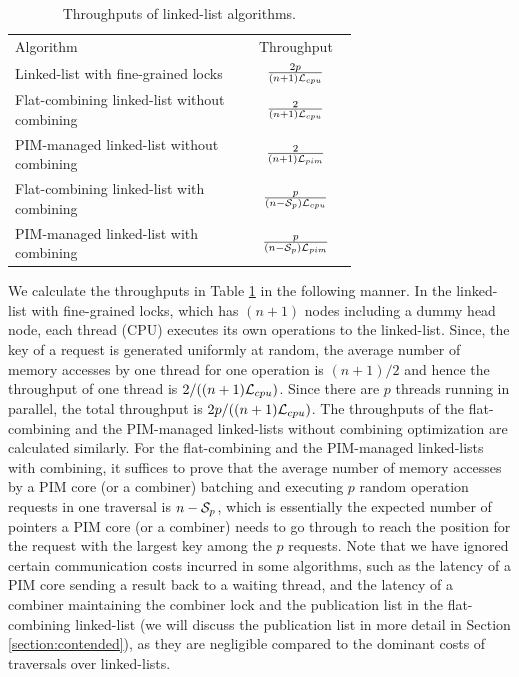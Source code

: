 \renewcommand{\arraystretch}{1.8}
\begin{table}[ht!]
\begin{center}
	\begin{tabular}{| m{0.68\linewidth}  | c |}    
    \hline
    Algorithm & Throughput\\ \hhline{|=|=|}
    Linked-list with fine-grained locks & ${2p \over (n+1)\mathcal{L}_{cpu}}$ \\ \hline
    Flat-combining linked-list without combining & ${2 \over (n+1)\mathcal{L}_{cpu}}$ \\ \hline
    PIM-managed linked-list without combining & ${2 \over (n+1)\mathcal{L}_{pim}}$ \\ \hline
    Flat-combining linked-list with combining & ${p \over (n-\mathcal{S}_{p})\mathcal{L}_{cpu}}$ \\ \hline
    PIM-managed linked-list with combining & ${p \over (n-\mathcal{S}_{p})\mathcal{L}_{pim}}$ \\ \hline
    \end{tabular}
\end{center}
\caption{Throughputs of linked-list algorithms.}
\label{tab:linkedlist}
\end{table}

We calculate the throughputs in Table \ref{tab:linkedlist} in the following manner. 
In the linked-list with fine-grained locks, which has $(n+1)$ nodes including 
a dummy head node, each thread (CPU) executes its own operations to the linked-list. 
Since, the key of a request is generated uniformly at random, 
the average number of memory accesses by one thread for one operation is $(n+1)/2$ 
and hence the throughput of one thread is $2/((n+1)\mathcal{L}_{cpu})$. 
Since there are $p$ threads running in parallel, the total throughput is $2p/((n+1)\mathcal{L}_{cpu})$. 
The throughputs of the flat-combining and the PIM-managed linked-lists without combining optimization 
are calculated similarly. 
For the flat-combining and the PIM-managed linked-lists with combining, it suffices to prove that
the average number of memory accesses by a PIM core (or a combiner) batching and executing 
$p$ random operation requests in one traversal is $n - \mathcal{S}_{p}$, 
which is essentially the expected number of pointers a PIM core (or a combiner) 
needs to go through to reach the position for the request with the largest key among the $p$ requests. 
Note that we have ignored certain communication costs incurred in some algorithms, 
such as the latency of a PIM core sending a result back to a waiting thread, 
and the latency of a combiner maintaining the combiner lock and the publication list in the flat-combining 
linked-list (we will discuss the publication list in more detail in Section \ref{section:contended}), 
as they are negligible compared to the dominant costs of traversals over linked-lists.
 
